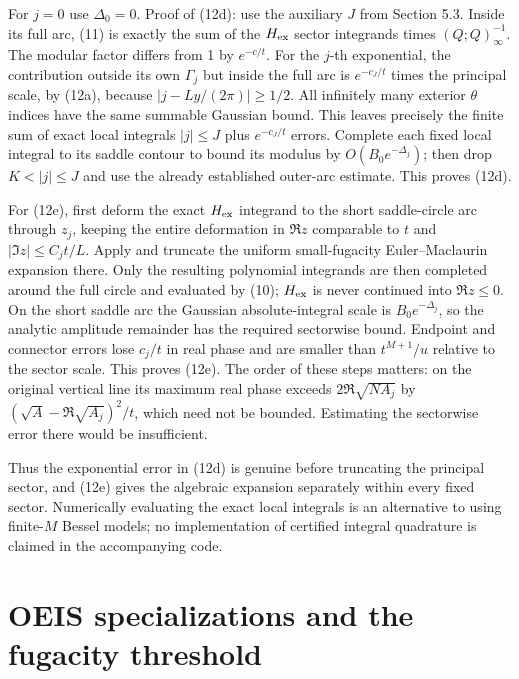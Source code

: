 \documentclass[11pt,letterpaper]{article}
\begin{document}
For \(j=0\) use \(\Delta_0=0\). Proof of (12d): use the auxiliary \(J\)
from Section 5.3. Inside its full arc, (11) is exactly the sum of the
\(H_{\rm ex}\) sector integrands times \((Q;Q)_\infty^{-1}\). The
modular factor differs from 1 by \(e^{-c/t}\). For the \(j\)-th
exponential, the contribution outside its own \(\Gamma_j\) but inside
the full arc is \(e^{-c_J/t}\) times the principal scale, by (12a),
because \(|j-Ly/(2\pi)|\ge1/2\). All infinitely many exterior \(\theta\)
indices have the same summable Gaussian bound. This leaves precisely the
finite sum of exact local integrals \(|j|\le J\) plus \(e^{-c_J/t}\)
errors. Complete each fixed local integral to its saddle contour to
bound its modulus by \(O(B_0e^{-\Delta_j})\); then drop \(K<|j|\le J\)
and use the already established outer-arc estimate. This proves (12d).

For (12e), first deform the exact \(H_{\rm ex}\) integrand to the short
saddle-circle arc through \(z_j\), keeping the entire deformation in
\(\Re z\) comparable to \(t\) and \(|\Im z|\le C_jt/L\). Apply and
truncate the uniform small-fugacity Euler--Maclaurin expansion there.
Only the resulting polynomial integrands are then completed around the
full circle and evaluated by (10); \(H_{\rm ex}\) is never continued
into \(\Re z\le0\). On the short saddle arc the Gaussian
absolute-integral scale is \(B_0e^{-\Delta_j}\), so the analytic
amplitude remainder has the required sectorwise bound. Endpoint and
connector errors lose \(c_j/t\) in real phase and are smaller than
\(t^{M+1}/u\) relative to the sector scale. This proves (12e). The order
of these steps matters: on the original vertical line its maximum real
phase exceeds \(2\Re\sqrt{NA_j}\) by \((\sqrt A-\Re\sqrt{A_j})^2/t\),
which need not be bounded. Estimating the sectorwise error there would
be insufficient.

Thus the exponential error in (12d) is genuine before truncating the
principal sector, and (12e) gives the algebraic expansion separately
within every fixed sector. Numerically evaluating the exact local
integrals is an alternative to using finite-\(M\) Bessel models; no
implementation of certified integral quadrature is claimed in the
accompanying code.

\section{OEIS specializations and the fugacity
threshold}\label{mfp:oeis-specializations-and-the-fugacity-threshold}
\end{document}
